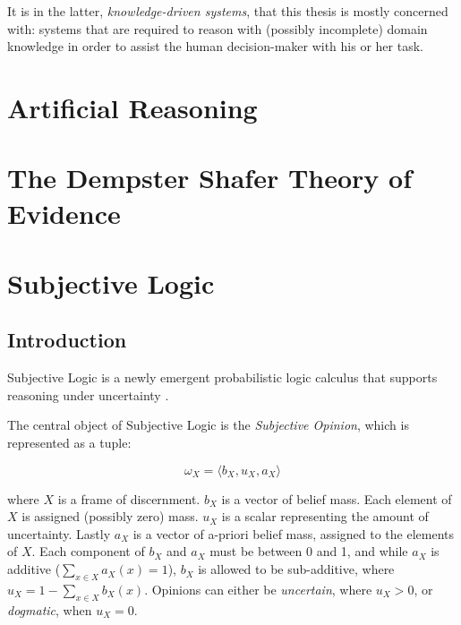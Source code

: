 \documentclass[thesis.tex]{subfiles}
\begin{document}
It is in the latter, \emph{knowledge-driven systems}, that this thesis is mostly concerned with: systems
that are required to reason with (possibly incomplete) domain knowledge in order to assist the human
decision-maker with his or her task.





\section{Artificial Reasoning}






\section{The Dempster Shafer Theory of Evidence}











\section{Subjective Logic}

\subsection{Introduction}

Subjective Logic is a newly emergent probabilistic logic calculus that supports reasoning
under uncertainty \cite{josang2001logic}.

The central object of Subjective Logic is the \emph{Subjective Opinion}, which is represented
as a tuple:

$$
\omega_X = \langle b_X, u_X, a_X \rangle
$$

where $X$ is a frame of discernment. $b_X$ is a vector of belief mass. Each element of $X$ is
assigned (possibly zero) mass. $u_X$ is a scalar representing the amount of uncertainty.
Lastly $a_X$ is a vector of a-priori belief mass, assigned to the elements of $X$. Each component
of $b_X$ and $a_X$ must be between 0 and 1, and while $a_X$ is additive ($\sum_{x \in X} a_X(x) = 1$),
$b_X$ is allowed to be sub-additive, where $u_X = 1 - \sum_{x \in X} b_X(x)$.
Opinions can either be \emph{uncertain}, where $u_X > 0$, or \emph{dogmatic}, when $u_X = 0$.
\end{document}
